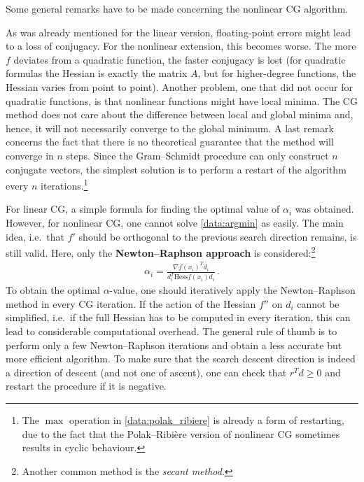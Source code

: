     Some general remarks have to be made concerning the nonlinear CG algorithm.
    \begin{remark}
        As was already mentioned for the linear version, floating-point errors might lead to a loss of conjugacy. For the nonlinear extension, this becomes worse. The more $f$ deviates from a quadratic function, the faster conjugacy is lost (for quadratic formulas the Hessian is exactly the matrix $A$, but for higher-degree functions, the Hessian varies from point to point). Another problem, one that did not occur for quadratic functions, is that nonlinear functions might have local minima. The CG method does not care about the difference between local and global minima and, hence, it will not necessarily converge to the global minimum. A last remark concerns the fact that there is no theoretical guarantee that the method will converge in $n$ steps. Since the Gram--Schmidt procedure can only construct $n$ conjugate vectors, the simplest solution is to perform a restart of the algorithm every $n$ iterations.\footnote{The $\max$ operation in \cref{data:polak_ribiere} is already a form of restarting, due to the fact that the Polak--Ribi\`ere version of nonlinear CG sometimes results in cyclic behaviour.}
    \end{remark}

    For linear CG, a simple formula for finding the optimal value of $\alpha_i$ was obtained. However, for nonlinear CG, one cannot solve \cref{data:argmin} as easily. The main idea, i.e.~that $f'$ should be orthogonal to the previous search direction remains, is still valid. Here, only the \textbf{Newton--Raphson approach} is considered:\footnote{Another common method is the \textit{secant method}.}
    \begin{gather}
        \alpha_i = \frac{\nabla f(x_i)^Td_i}{d_i^T\mathrm{Hess}f(x_i)d_i}\,.
    \end{gather}
    To obtain the optimal $\alpha$-value, one should iteratively apply the Newton--Raphson method in every CG iteration. If the action of the Hessian $f''$ on $d_i$ cannot be simplified, i.e.~if the full Hessian has to be computed in every iteration, this can lead to considerable computational overhead. The general rule of thumb is to perform only a few Newton--Raphson iterations and obtain a less accurate but more efficient algorithm. To make sure that the search descent direction is indeed a direction of descent (and not one of ascent), one can check that $r^Td\geq0$ and restart the procedure if it is negative.

